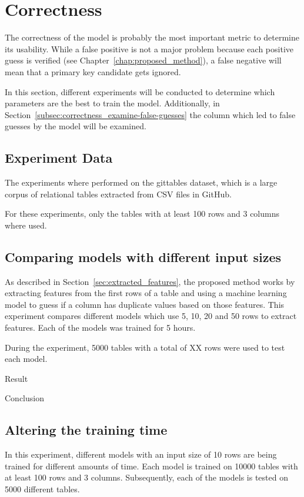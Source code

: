 \section{Correctness}\label{sec:correctness}
The correctness of the model is probably the most important metric to determine its usability. While a false positive is not a major problem because each positive guess is verified (see Chapter~\ref{chap:proposed_method}), a false negative will mean that a primary key candidate gets ignored.

In this section, different experiments will be conducted to determine which parameters are the best to train the model. Additionally, in Section~\ref{subsec:correctness_examine-false-guesses} the column which led to false guesses by the model will be examined.


\subsection{Experiment Data}\label{subsec:correctness_experiment-data} %
The experiments where performed on the gittables dataset, which is a large corpus of relational tables extracted from CSV files in GitHub\cite{gittables-article}.

For these experiments, only the tables with at least 100 rows and 3 columns where used. %


\subsection{Comparing models with different input sizes}\label{subsec:correctness_comparing-input-size} %
As described in Section~\ref{sec:extracted_features}, the proposed method works by extracting features from the first rows of a table and using a machine learning model to guess if a column has duplicate values based on those features. This experiment compares different models which use \num{5}, \num{10}, \num{20} and \num{50} rows to extract features. Each of the models was trained for \num{5} hours.

During the experiment, \num{5000} tables with a total of XX rows were used to test each model.

Result

Conclusion

\subsection{Altering the training time}\label{subsec:correctness_comparing-training-time} %
In this experiment, different models with an input size of \num{10} rows are being trained for different amounts of time. Each model is trained on \num{10000} tables with at least \num{100} rows and \num{3} columns. Subsequently, each of the models is tested on \num{5000} different tables.

